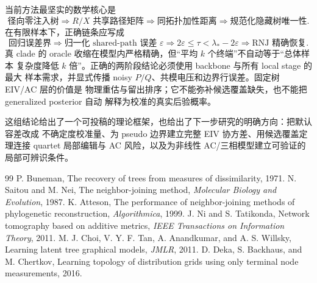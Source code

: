 \documentclass[UTF8,11pt]{ctexart}
\begin{document}
当前方法最坚实的数学核心是
\begin{equation*}
 \text{径向零注入树}
 \Longrightarrow
 R/X\text{ 共享路径矩阵}
 \Longrightarrow
 \text{同拓扑加性距离}
 \Longrightarrow
 \text{规范化隐藏树唯一性}.
\end{equation*}
在有限样本下，正确链条应写成
\begin{equation*}
 \text{回归误差界}
 \Longrightarrow
 \text{归一化 shared-path 误差 }\varepsilon
 \Longrightarrow
 2\varepsilon\le\tau<\lambda_*-2\varepsilon
 \Longrightarrow
 \text{RNJ 精确恢复}.
\end{equation*}
真 clade 的 oracle 收缩在模型内严格精确，但“平均 $k$ 个终端”不自动等于“总体样本
复杂度降低 $k$ 倍”。正确的两阶段结论必须使用 backbone 与所有 local stage 的最大
样本需求，并显式传播 noisy $P/Q$、共模电压和边界行误差。固定树 EIV/AC 层的价值是
物理重估与留出排序；它不能弥补候选覆盖缺失，也不能把 generalized posterior 自动
解释为校准的真实后验概率。

这组结论给出了一个可投稿的理论框架，也给出了下一步研究的明确方向：把默认容差改成
不确定度校准量、为 pseudo 边界建立完整 EIV 协方差、用候选覆盖定理连接 quartet
局部编辑与 AC 风险，以及为非线性 AC/三相模型建立可验证的局部可辨识条件。

\begin{thebibliography}{99}
P. Buneman, The recovery of trees from measures of dissimilarity, 1971.
N. Saitou and M. Nei, The neighbor-joining method, \emph{Molecular Biology and Evolution}, 1987.
K. Atteson, The performance of neighbor-joining methods of phylogenetic reconstruction,
\emph{Algorithmica}, 1999.
J. Ni and S. Tatikonda, Network tomography based on additive metrics,
\emph{IEEE Transactions on Information Theory}, 2011.
M. J. Choi, V. Y. F. Tan, A. Anandkumar, and A. S. Willsky,
Learning latent tree graphical models, \emph{JMLR}, 2011.
D. Deka, S. Backhaus, and M. Chertkov,
Learning topology of distribution grids using only terminal node measurements, 2016.
\end{thebibliography}
\end{document}
